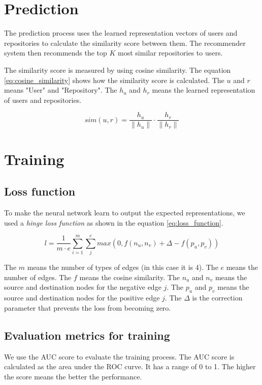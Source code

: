 \documentclass[11pt,twoside]{report}
\begin{document}
\section{Prediction}
The prediction process uses the learned representation vectors of users and repositories to calculate the similarity score between them. The recommender system then recommends the top $K$ most similar repositories to users.

The similarity score is measured by using cosine similarity. The equation \ref{eq:cosine_similarity} shows how the similarity score is calculated. The $u$ and $r$ means "User" and "Repository". The $h_u$ and $h_r$ means the learned representation of users and repositories.

\begin{equation}
    sim(u, r) = \frac{h_u}{\|h_u\|}\cdot\frac{h_r}{\|h_r\|}
    \label{eq:cosine_similarity}
\end{equation}

\section{Training}
\subsection{Loss function}
To make the neural network learn to output the expected representations, we used a \textit{hinge loss function} as shown in the equation \ref{eq:loss_function}.

\begin{equation}
    l=\frac{1}{m\cdot{e}}\sum_{i=1}^{m}\sum_{j}^{e} max(0, f(n_u, n_v)+\Delta-f(p_u, p_v))
    \label{eq:loss_function}
\end{equation}

The $m$ means the number of types of edges (in this case it is 4). The $e$ means the number of edges. The $f$ means the cosine similarity. The $n_u$ and $n_v$ means the source and destination nodes for the negative edge $j$. The $p_u$ and $p_v$ means the source and destination nodes for the positive edge $j$. The $\Delta$ is the correction parameter that prevents the loss from becoming zero.

\subsection{Evaluation metrics for training}
We use the AUC score to evaluate the training process. The AUC score is calculated as the area under the ROC curve. It has a range of 0 to 1. The higher the score means the better the performance.
\end{document}
